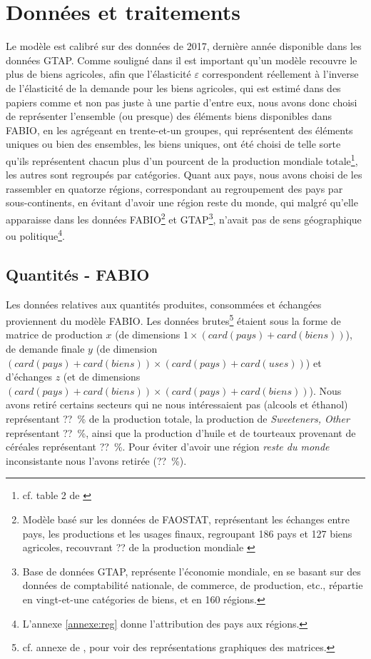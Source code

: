 \section{Données et traitements}

Le modèle est calibré sur des données de 2017, dernière année disponible dans les données GTAP. Comme souligné dans \cite{Gouel2021} il est important qu'un modèle recouvre le plus de biens agricoles, afin que l'élasticité $\varepsilon$ correspondent réellement à l'inverse de l'élasticité de la demande pour les biens agricoles, qui est estimé dans des papiers comme \cite{Comin2021} et non pas juste à une partie d'entre eux, nous avons donc choisi de représenter l'ensemble (ou presque) des éléments biens disponibles dans FABIO, en les agrégeant en trente-et-un groupes, qui représentent des éléments uniques ou bien des ensembles, les biens uniques, ont été choisi de telle sorte qu'ils représentent chacun plus d'un pourcent de la production mondiale totale\footnote{cf. table 2 de \cite{Gouel2021}}, les autres sont regroupés par catégories. Quant aux pays, nous avons choisi de les rassembler en quatorze régions, correspondant au regroupement des pays par sous-continents, en évitant d'avoir une région reste du monde, qui malgré qu'elle apparaisse dans les données FABIO\footnote{Modèle basé sur les données de FAOSTAT, représentant les échanges entre pays, les productions et les usages finaux, regroupant 186 pays et 127 biens agricoles, recouvrant ?? de la production mondiale \cite{Bruckner2019}} et GTAP\footnote{Base de données GTAP, représente l'économie mondiale, en se basant sur des données de comptabilité nationale, de commerce, de production, etc., répartie en vingt-et-une catégories de biens, et en 160 régions.}, n'avait pas de sens géographique ou politique\footnote{L'annexe \ref{annexe:reg} donne l'attribution des pays aux régions.}.


\subsection{Quantités - FABIO}

Les données relatives aux quantités produites, consommées et échangées proviennent du modèle FABIO. Les données brutes\footnote{cf. annexe de \cite{Bruckner2019}, pour voir des représentations graphiques des matrices.} étaient sous la forme de matrice de production $x$ (de dimensions $1 \times (card(pays)+card(biens))$), de demande finale $y$ (de dimension $(card(pays)+card(biens)) \times (card(pays)+card(uses))$) et d'échanges $z$ (et de dimensions $(card(pays)+card(biens)) \times (card(pays)+card(biens))$). Nous avons retiré certains secteurs qui ne nous intéressaient pas (alcools et éthanol) représentant ??~\% de la production totale, la production de \textit{Sweeteners, Other} représentant ??~\%, ainsi que la production d'huile et de tourteaux provenant de céréales représentant ??~\%. Pour éviter d'avoir une région \textit{reste du monde} inconsistante nous l'avons retirée (??~\%).

